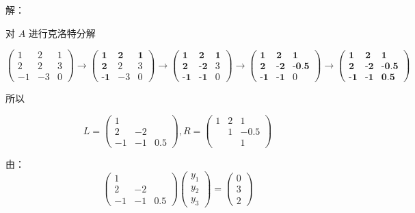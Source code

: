 \documentclass{article}
\begin{document}
\noindent 解：

对 $A$ 进行克洛特分解

$$
\begin{pmatrix}
    1 & 2 & 1 \\
    2 & 2 & 3 \\
    -1 & -3 & 0
\end{pmatrix}
\longrightarrow
\begin{pmatrix}
    \textbf{1} & \textbf{2} & \textbf{1} \\
    \textbf{2} & 2 & 3 \\
    \textbf{-1} & -3 & 0
\end{pmatrix}
\longrightarrow
\begin{pmatrix}
    \textbf{1} & \textbf{2} & \textbf{1} \\
    \textbf{2} & \textbf{-2} & 3 \\
    \textbf{-1} & \textbf{-1} & 0
\end{pmatrix}
\longrightarrow
\begin{pmatrix}
    \textbf{1} & \textbf{2} & \textbf{1} \\
    \textbf{2} & \textbf{-2} & \textbf{-0.5} \\
    \textbf{-1} & \textbf{-1} & 0
\end{pmatrix}
\longrightarrow
\begin{pmatrix}
    \textbf{1} & \textbf{2} & \textbf{1} \\
    \textbf{2} & \textbf{-2} & \textbf{-0.5} \\
    \textbf{-1} & \textbf{-1} & \textbf{0.5}
\end{pmatrix}
$$

所以

$$
L = 
\begin{pmatrix}
    1 &  &  \\
    2 & -2 &  \\
    -1 & -1 & 0.5
\end{pmatrix}, 
R = 
\begin{pmatrix}
    1 & 2 & 1 \\
      & 1 & -0.5 \\
      &   & 1
\end{pmatrix}
$$

由：
$$
\begin{pmatrix}
    1 &  &  \\
    2 & -2 &  \\
    -1 & -1 & 0.5
\end{pmatrix}
\begin{pmatrix}
    y_1 \\
    y_2 \\
    y_3 
\end{pmatrix}
=
\begin{pmatrix}
    0 \\
    3 \\
    2
\end{pmatrix}
$$
\end{document}
